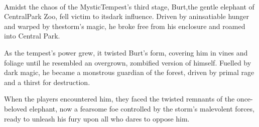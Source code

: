 \vfill\eject
\vspace*{2.75cm}\hfill\\
\hspace*{4cm}Amidst the chaos of the Mystic\linebreak\hspace*{4.5cm}Tempest's third stage, Burt,\linebreak\hspace*{4.5cm}the gentle elephant of Central\linebreak\hspace*{4.5cm}Park Zoo, fell victim to its\linebreak\hspace*{4.5cm}dark influence. Driven by an\linebreak\hspace*{3.5cm}insatiable hunger and warped by the\linebreak\hspace*{2cm}storm's magic, he broke free from his enclosure and roamed into Central Park.

As the tempest's power grew, it twisted Burt's form, covering him in vines and foliage until he resembled an overgrown, zombified version of himself. Fuelled by dark magic, he became a monstrous guardian of the forest, driven by primal rage and a thirst for destruction.

When the players encountered him, they faced the twisted remnants of the once-beloved elephant, now a fearsome foe controlled by the storm's malevolent forces, ready to unleash his fury upon all who dares to oppose him.

\DungeonSheetGeometry
